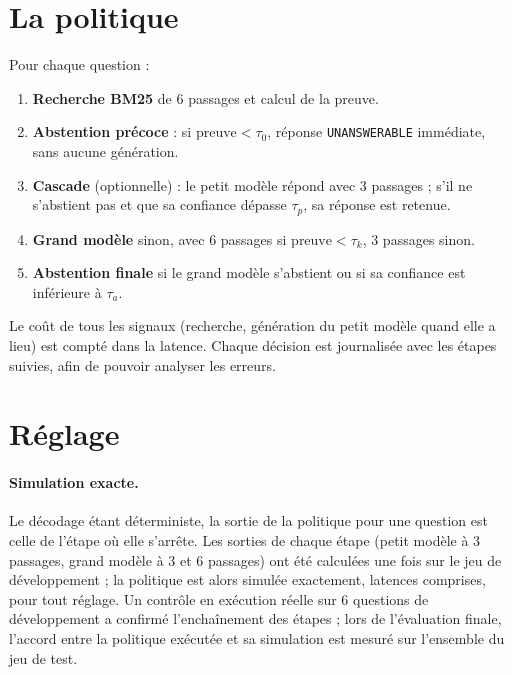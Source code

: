 \documentclass[11pt,a4paper]{article}
\begin{document}
\section{La politique}\label{sec:politique}

Pour chaque question :
\begin{enumerate}
\item \textbf{Recherche BM25} de 6 passages et calcul de la preuve.
\item \textbf{Abstention précoce} : si $\text{preuve} < \tau_0$, réponse \texttt{UNANSWERABLE} immédiate,
sans aucune génération.
\item \textbf{Cascade} (optionnelle) : le petit modèle répond avec 3 passages ; s'il ne s'abstient pas et
que sa confiance dépasse $\tau_p$, sa réponse est retenue.
\item \textbf{Grand modèle} sinon, avec 6 passages si $\text{preuve} < \tau_k$, 3 passages sinon.
\item \textbf{Abstention finale} si le grand modèle s'abstient ou si sa confiance est inférieure à
$\tau_a$.
\end{enumerate}
Le coût de tous les signaux (recherche, génération du petit modèle quand elle a lieu) est compté dans la
latence. Chaque décision est journalisée avec les étapes suivies, afin de pouvoir analyser les erreurs.

\section{Réglage}\label{sec:reglage}

\paragraph{Simulation exacte.} Le décodage étant déterministe, la sortie de la politique pour une
question est celle de l'étape où elle s'arrête. Les sorties de chaque étape (petit modèle à 3 passages,
grand modèle à 3 et 6 passages) ont été calculées une fois sur le jeu de développement ; la politique est
alors simulée exactement, latences comprises, pour tout réglage. Un contrôle en exécution réelle sur
6 questions de développement a confirmé l'enchaînement des étapes ; lors de l'évaluation finale,
l'accord entre la politique exécutée et sa simulation est mesuré sur l'ensemble du jeu de test.
\end{document}
